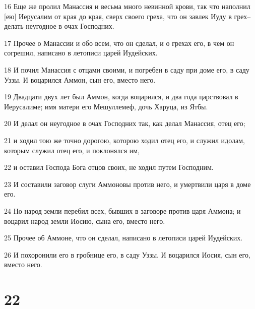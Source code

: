 \par 16 Еще же пролил Манассия и весьма много невинной крови, так что наполнил [ею] Иерусалим от края до края, сверх своего греха, что он завлек Иуду в грех--делать неугодное в очах Господних.
\par 17 Прочее о Манассии и обо всем, что он сделал, и о грехах его, в чем он согрешил, написано в летописи царей Иудейских.
\par 18 И почил Манассия с отцами своими, и погребен в саду при доме его, в саду Уззы. И воцарился Аммон, сын его, вместо него.
\par 19 Двадцати двух лет был Аммон, когда воцарился, и два года царствовал в Иерусалиме; имя матери его Мешуллемеф, дочь Харуца, из Ятбы.
\par 20 И делал он неугодное в очах Господних так, как делал Манассия, отец его;
\par 21 и ходил тою же точно дорогою, которою ходил отец его, и служил идолам, которым служил отец его, и поклонялся им,
\par 22 и оставил Господа Бога отцов своих, не ходил путем Господним.
\par 23 И составили заговор слуги Аммоновы против него, и умертвили царя в доме его.
\par 24 Но народ земли перебил всех, бывших в заговоре против царя Аммона; и воцарил народ земли Иосию, сына его, вместо него.
\par 25 Прочее об Аммоне, что он сделал, написано в летописи царей Иудейских.
\par 26 И похоронили его в гробнице его, в саду Уззы. И воцарился Иосия, сын его, вместо него.

\chapter{22}

